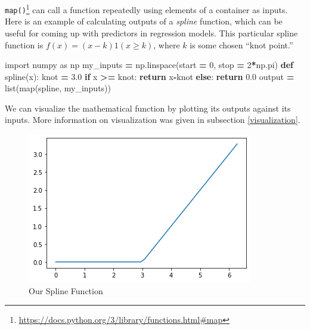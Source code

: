 \documentclass[
  12pt,
  krantz2]{krantz}
\makeatletter
\newenvironment{Shaded}{\begin{snugshade}}{\end{snugshade}}
\newcommand{\BuiltInTok}[1]{#1}
\newcommand{\ControlFlowTok}[1]{\textcolor[rgb]{0.27,0.27,0.27}{\textbf{#1}}}
\newcommand{\DecValTok}[1]{\textcolor[rgb]{0.06,0.06,0.06}{#1}}
\newcommand{\FloatTok}[1]{\textcolor[rgb]{0.06,0.06,0.06}{#1}}
\newcommand{\ImportTok}[1]{#1}
\newcommand{\KeywordTok}[1]{\textcolor[rgb]{0.27,0.27,0.27}{\textbf{#1}}}
\newcommand{\NormalTok}[1]{#1}
\newcommand{\OperatorTok}[1]{\textcolor[rgb]{0.43,0.43,0.43}{\textbf{#1}}}
\renewcommand{\href}[2]{#2\footnote{\url{#1}}}
\newenvironment{kframe}{%
\medskip{}
\setlength{\fboxsep}{.8em}
 \def\at@end@of@kframe{}%
 \ifinner\ifhmode%
  \def\at@end@of@kframe{\end{minipage}}%
  \begin{minipage}{\columnwidth}%
 \fi\fi%
 \def\FrameCommand##1{\hskip\@totalleftmargin \hskip-\fboxsep
 \colorbox{shadecolor}{##1}\hskip-\fboxsep
     \hskip-\linewidth \hskip-\@totalleftmargin \hskip\columnwidth}%
 \MakeFramed {\advance\hsize-\width
   \@totalleftmargin\z@ \linewidth\hsize
   \@setminipage}}%
 {\par\unskip\endMakeFramed%
 \at@end@of@kframe}
\renewenvironment{Shaded}{\begin{kframe}}{\end{kframe}}
\makeatother
\begin{document}
\href{https://docs.python.org/3/library/functions.html\#map}{\texttt{map()}} can call a function repeatedly using elements of a container as inputs. Here is an example of calculating outputs of a \emph{spline} function, which can be useful for coming up with predictors in regression models. This particular spline function is \(f(x) = (x-k)1(x \ge k)\), where \(k\) is some chosen ``knot point.''

\begin{Shaded}
\begin{Highlighting}[]
\ImportTok{import}\NormalTok{ numpy }\ImportTok{as}\NormalTok{ np}
\NormalTok{my\_inputs }\OperatorTok{=}\NormalTok{ np.linspace(start }\OperatorTok{=} \DecValTok{0}\NormalTok{, stop }\OperatorTok{=} \DecValTok{2}\OperatorTok{*}\NormalTok{np.pi)}
\KeywordTok{def}\NormalTok{ spline(x):}
\NormalTok{    knot }\OperatorTok{=} \FloatTok{3.0}
    \ControlFlowTok{if}\NormalTok{ x }\OperatorTok{\textgreater{}=}\NormalTok{ knot:}
        \ControlFlowTok{return}\NormalTok{ x}\OperatorTok{{-}}\NormalTok{knot}
    \ControlFlowTok{else}\NormalTok{:}
        \ControlFlowTok{return} \FloatTok{0.0}
\NormalTok{output }\OperatorTok{=} \BuiltInTok{list}\NormalTok{(}\BuiltInTok{map}\NormalTok{(spline, my\_inputs))}
\end{Highlighting}
\end{Shaded}

We can visualize the mathematical function by plotting its outputs against its inputs. More information on visualization was given in subsection \ref{visualization}.

\begin{figure}

{\centering \includegraphics[width=0.8\linewidth]{pics/spline} 

}

\caption{Our Spline Function}\label{fig:unnamed-chunk-275}
\end{figure}
\end{document}
